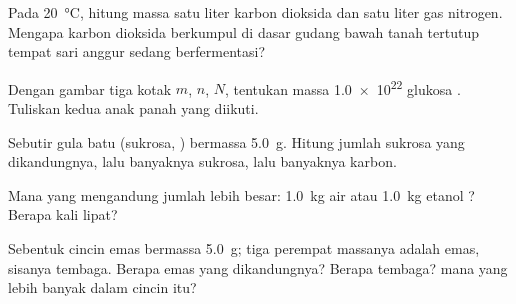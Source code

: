 \begin{exercise}[$\star\star$]\label{exo:g10:the-mole:8}
Pada \qty{20}{\celsius}, hitung massa satu liter karbon dioksida dan
satu liter gas nitrogen. Mengapa karbon dioksida berkumpul di dasar
gudang bawah tanah tertutup tempat sari anggur sedang berfermentasi?
\end{exercise}

\begin{exercise}[$\star\star$]\label{exo:g10:the-mole:9}
Dengan gambar tiga kotak $m$, $n$, $N$, tentukan massa \num{1.0e22}
 glukosa . Tuliskan kedua anak panah yang diikuti.
\end{exercise}

\begin{exercise}[$\star\star$]\label{exo:g10:the-mole:10}
Sebutir gula batu (sukrosa, ) bermassa \qty{5.0}{g}.
Hitung jumlah sukrosa yang dikandungnya, lalu banyaknya 
sukrosa, lalu banyaknya  karbon.
\end{exercise}

\begin{exercise}[$\star\star$]\label{exo:g10:the-mole:11}
Mana yang mengandung jumlah  lebih besar: \qty{1.0}{kg} air
 atau \qty{1.0}{kg} etanol ? Berapa kali lipat?
\end{exercise}

\begin{exercise}[$\star\star\star$]\label{exo:g10:the-mole:12}
Sebentuk cincin emas bermassa \qty{5.0}{g}; tiga perempat massanya
adalah emas, sisanya tembaga. Berapa  emas yang dikandungnya? Berapa
 tembaga?  mana yang  lebih banyak dalam cincin itu?
\end{exercise}

